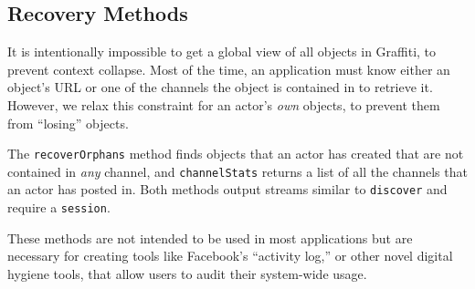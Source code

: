 \subsection{Recovery Methods}

It is intentionally impossible to get a global view of all objects
in Graffiti, to prevent context collapse. Most of the time,
an application must know either an object's URL or one of the channels
the object is contained in to retrieve it. However, we relax this
constraint for an actor's \emph{own} objects, to prevent them from
``losing'' objects.

The \texttt{recoverOrphans} method finds objects that an actor has created
that are not contained in \emph{any} channel, and \texttt{channelStats}
returns a list of all the channels that an actor has posted in.
Both methods output streams similar to \texttt{discover}
and require a \texttt{session}.

These methods are not intended to be used in most applications but are
necessary for creating tools like Facebook's ``activity log,''
or other novel digital hygiene tools,
that allow users to audit their system-wide usage.
